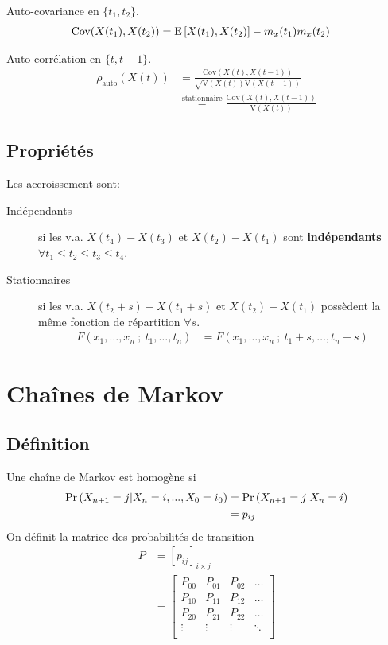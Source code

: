\documentclass[10pt, french, landscape]{article}
\begin{document}
\begin{multicols*}{2}
Auto-covariance en $\{t_{1}, t_{2} \}$.
\begin{align*}
	\text{Cov}(X(t_{1}), X(t_{2})) &= \mathrm{E} \left[ X(t_{1}),X(t_{2}) \right] - m_{x}(t_{1}) m_{x}(t_{2})
\end{align*}

Auto-corrélation en $\{t, t - 1 \}$.
\begin{align*}
	\rho_{\text{auto}}(X(t)) &= \frac{\text{Cov}(X(t), X(t - 1))}{\sqrt{\text{V}(X(t))\text{V}(X(t - 1))}} \\
	&\overset{\text{stationnaire}}=  \frac{\text{Cov}(X(t), X(t - 1))}{\text{V}(X(t))}
\end{align*}

\subsection*{Propriétés}

Les accroissement sont:
\begin{description}
	\item[Indépendants] si les v.a. $X(t_{4}) - X(t_{3})$ et $X(t_{2}) - X(t_{1})$ sont \textbf{indépendants} $\forall	t_{1} \le t_{2} \le t_{3} \le t_{4}$.
	\item[Stationnaires] si les v.a. $X(t_{2} + s) - X(t_{1} + s)$ et $X(t_{2}) - X(t_{1})$ possèdent la même fonction de répartition $\forall	s$.
	\begin{align*}
		F(x_{1}, \dots, x_{n} \ ; \ t_{1}, \dots, t_{n}) &= F(x_{1}, \dots, x_{n} \ ; \ t_{1} + s, \dots, t_{n} + s)
	\end{align*}
\end{description}



\section{Chaînes de Markov}
\subsection*{Définition}
Une chaîne de Markov est homogène si
\begin{align*}
\Pr \left( X_{n+1} = j | X_{n}=i, ..., X_0 = i_0 \right) & = \Pr \left( X_{n+1} = j | X_n = i \right)  \\
 & = p_{ij} \\
\end{align*}
On définit la matrice des probabilités de transition
\begin{align*}
P &= [p_{ij}]_{i \times j} \\
&= \left[
\begin{matrix}
	P_{00} & P_{01} & P_{02} & \dots \\
	P_{10} & P_{11} & P_{12} & \dots \\
	P_{20} & P_{21} & P_{22} & \dots \\
	\vdots & \vdots & \vdots & \ddots \\
\end{matrix}
\right]
\end{align*}


\end{multicols*}
\end{document}
